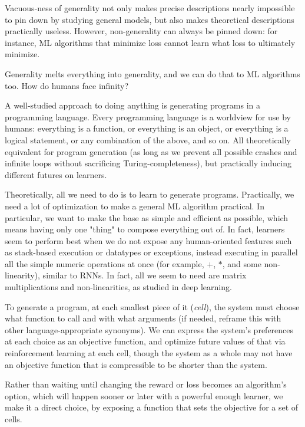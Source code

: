 \documentclass{article}
\begin{document}
Vacuous-ness of generality not only makes precise descriptions nearly impossible to pin down by studying general models, but also makes theoretical descriptions practically useless. However, non-generality can always be pinned down: for instance, ML algorithms that minimize loss cannot learn what loss to ultimately minimize.

Generality melts everything into generality, and we can do that to ML algorithms too. How do humans face infinity?

A well-studied approach to doing anything is generating programs in a programming language. Every programming language is a worldview for use by humans: everything is a function, or everything is an object, or everything is a logical statement, or any combination of the above, and so on. All theoretically equivalent for program generation (as long as we prevent all possible crashes and infinite loops without sacrificing Turing-completeness), but practically inducing different futures on learners.

Theoretically, all we need to do is to learn to generate programs. Practically, we need a lot of optimization to make a general ML algorithm practical. In particular, we want to make the base as simple and efficient as possible, which means having only one "thing" to compose everything out of. In fact, learners seem to perform best when we do not expose any human-oriented features such as stack-based execution or datatypes or exceptions, instead executing in parallel all the simple numeric operations at once (for example, $+$, $*$, and some non-linearity), similar to RNNs. In fact, all we seem to need are matrix multiplications and non-linearities, as studied in deep learning.

To generate a program, at each smallest piece of it (\textit{cell}), the system must choose what function to call and with what arguments (if needed, reframe this with other language-appropriate synonyms). We can express the system's preferences at each choice as an objective function, and optimize future values of that via reinforcement learning at each cell, though the system as a whole may not have an objective function that is compressible to be shorter than the system.

Rather than waiting until changing the reward or loss becomes an algorithm's option, which will happen sooner or later with a powerful enough learner, we make it a direct choice, by exposing a function that sets the objective for a set of cells.
\end{document}
